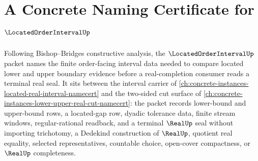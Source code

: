\chapter{A Concrete Naming Certificate for $\LocatedOrderIntervalUp$}
\label{ch:concrete-instances-located-order-interval-namecert}

Following Bishop--Bridges constructive analysis, the $\LocatedOrderIntervalUp$ packet names the finite order-facing interval data needed to compare located lower and upper boundary evidence before a real-completion consumer reads a terminal real seal. It sits between the interval carrier of \autoref{ch:concrete-instances-located-real-interval-namecert} and the two-sided cut surface of \autoref{ch:concrete-instances-lower-upper-real-cut-namecert}: the packet records lower-bound and upper-bound rows, a located-gap row, dyadic tolerance data, finite stream windows, regular-rational readback, and a terminal $\RealUp$ seal without importing trichotomy, a Dedekind construction of $\RealUp$, quotient real equality, selected representatives, countable choice, open-cover compactness, or $\RealUp$ completeness.

